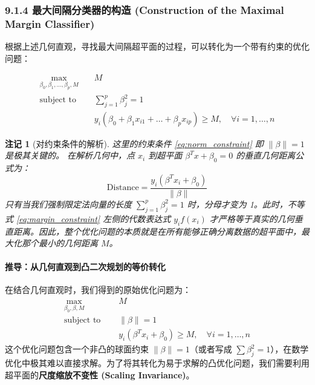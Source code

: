 \documentclass[UTF8]{ctexart}
\newtheorem{remark}{注记}[section]
\numberwithin{equation}{section}
\begin{document}
\subsubsection{9.1.4 最大间隔分类器的构造 (Construction of the Maximal Margin Classifier)}

根据上述几何直观，寻找最大间隔超平面的过程，可以转化为一个带有约束的优化问题：

\begin{align}
\max_{\beta_0, \beta_1, \dots, \beta_p, M} \quad & M \\
\text{subject to } \quad & \sum_{j=1}^p \beta_j^2 = 1 \label{eq:norm_constraint} \\
& y_i (\beta_0 + \beta_1 x_{i1} + \dots + \beta_p x_{ip}) \ge M, \quad \forall i=1,\dots,n \label{eq:margin_constraint}
\end{align}

\begin{remark}[对约束条件的解析]
这里的约束条件 \eqref{eq:norm_constraint} 即 $\|\beta\| = 1$ 是极其关键的。
在解析几何中，点 $x_i$ 到超平面 $\beta^T x + \beta_0 = 0$ 的垂直几何距离公式为：
$$\text{Distance} = \frac{y_i (\beta^T x_i + \beta_0)}{\|\beta\|}$$
只有当我们强制限定法向量的长度 $\sum_{j=1}^p \beta_j^2 = 1$ 时，分母才变为 1。此时，不等式 \eqref{eq:margin_constraint} 左侧的代数表达式 $y_i f(x_i)$ 才严格等于真实的几何垂直距离。因此，整个优化问题的本质就是在所有能够正确分离数据的超平面中，最大化那个最小的几何距离 $M$。
\end{remark}


\paragraph{推导：从几何直观到凸二次规划的等价转化}

在结合几何直观时，我们得到的原始优化问题为：
\begin{align*}
\max_{\beta_0, \beta, M} \quad & M \\
\text{subject to } \quad & \|\beta\| = 1 \\
& y_i (\beta^T x_i + \beta_0) \ge M, \quad \forall i=1,\dots,n
\end{align*}
这个优化问题包含一个非凸的球面约束 $\|\beta\| = 1$（或者写成 $\sum \beta_j^2 = 1$），在数学优化中极其难以直接求解。为了将其转化为易于求解的凸优化问题，我们需要利用超平面的\textbf{尺度缩放不变性 (Scaling Invariance)}。
\end{document}
